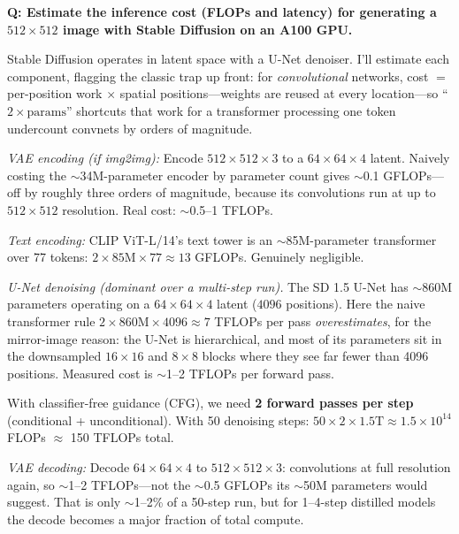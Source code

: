 \begin{interviewq}
\textbf{Q: Estimate the inference cost (FLOPs and latency) for generating a $512 \times 512$ image with Stable Diffusion on an A100 GPU.}

 \quad {} \quad \badgefreq{\freqlow}

\stronganswer Stable Diffusion operates in latent space with a U-Net denoiser. I'll estimate each component, flagging the classic trap up front: for \textit{convolutional} networks, cost $=$ per-position work $\times$ spatial positions---weights are reused at every location---so ``$2 \times \text{params}$'' shortcuts that work for a transformer processing one token undercount convnets by orders of magnitude.

\textit{VAE encoding (if img2img):} Encode $512 \times 512 \times 3$ to a $64 \times 64 \times 4$ latent. Naively costing the $\sim$34M-parameter encoder by parameter count gives $\sim$0.1 GFLOPs---off by roughly three orders of magnitude, because its convolutions run at up to $512 \times 512$ resolution. Real cost: $\sim$0.5--1 TFLOPs.

\textit{Text encoding:} CLIP ViT-L/14's text tower is an $\sim$85M-parameter transformer over 77 tokens: $2 \times 85\text{M} \times 77 \approx 13$ GFLOPs. Genuinely negligible.

\textit{U-Net denoising (dominant over a multi-step run).} The SD 1.5 U-Net has $\sim$860M parameters operating on a $64 \times 64 \times 4$ latent ($4096$ positions). Here the naive transformer rule $2 \times 860\text{M} \times 4096 \approx 7$ TFLOPs per pass \textit{overestimates}, for the mirror-image reason: the U-Net is hierarchical, and most of its parameters sit in the downsampled $16 \times 16$ and $8 \times 8$ blocks where they see far fewer than 4096 positions. Measured cost is $\sim$1--2 TFLOPs per forward pass.

With classifier-free guidance (CFG), we need \textbf{2 forward passes per step} (conditional + unconditional). With 50 denoising steps: $50 \times 2 \times 1.5\text{T} \approx 1.5 \times 10^{14}$ FLOPs $\approx$ 150 TFLOPs total.

\textit{VAE decoding:} Decode $64 \times 64 \times 4$ to $512 \times 512 \times 3$: convolutions at full resolution again, so $\sim$1--2 TFLOPs---not the $\sim$0.5 GFLOPs its $\sim$50M parameters would suggest. That is only $\sim$1--2\% of a 50-step run, but for 1--4-step distilled models the decode becomes a major fraction of total compute.


\end{interviewq}
